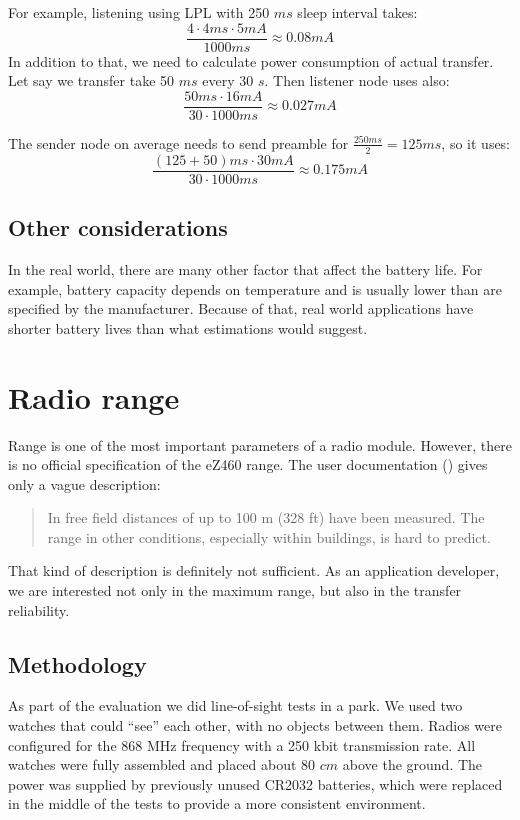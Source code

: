 For example, listening using LPL with 250 $ ms $ sleep interval takes:
$$
\frac{4 \cdot 4 ms \cdot 5 mA}{1000 ms} \approx 0.08 mA
$$
In addition to that, we need to calculate power consumption of actual transfer.
Let say we transfer take 50 $ ms $ every 30 $ s $.
Then listener node uses also:
$$
\frac{50 ms \cdot 16 mA}{30 \cdot 1000 ms} \approx 0.027 mA
$$

The sender node on average needs to send preamble for $ \frac{250 ms}{2} = 125 ms$, so it uses:
$$
\frac{(125 + 50) ms \cdot 30 mA}{30 \cdot 1000 ms} \approx 0.175 mA
$$

\subsection{Other considerations}
In the real world, there are many other factor that affect the battery life.
For example, battery capacity depends on temperature and is usually lower than are specified by the manufacturer.
Because of that, real world applications have shorter battery lives than what estimations would suggest.


\section{Radio range}

Range is one of the most important parameters of a radio module.
However, there is no official specification of the eZ460 range.
The user documentation (\cite{eZ430Chronos}) gives only a vague description:
\begin{quote}
In free field distances of up to 100 m (328 ft) have been measured. The range in other conditions,
especially within buildings, is hard to predict.
\end{quote}

That kind of description is definitely not sufficient.
As an application developer, we are interested not only in the maximum range, but also in the transfer reliability.


\subsection{Methodology}

As part of the evaluation we did line-of-sight tests in a park.
We used two watches that could ``see'' each other, with no objects between them.
Radios were configured for the 868 MHz frequency with a 250 kbit transmission rate.
All watches were fully assembled and placed about 80 $ cm $ above the ground.
The power was supplied by previously unused CR2032 batteries, which were replaced in the middle of the tests to provide a more consistent environment.


